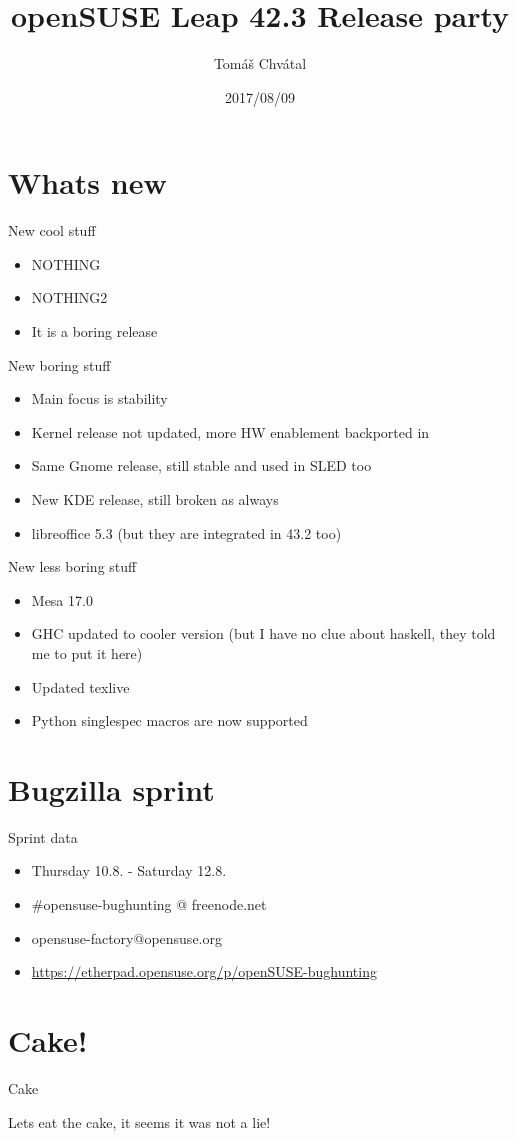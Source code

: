\documentclass{beamer}
\author{Tom\'{a}\v{s} Chv\'{a}tal\newline {\small tchvatal@suse.com}\newline {\small Packaging/L3 - Packaging}}
\title{openSUSE Leap 42.3 Release party}
\date{2017/08/09}
\begin{document}
\begin{frame}[t,plain]
\titlepage
\end{frame}

\section{Whats new}

\begin{frame}[t]{New cool stuff}
	\begin{itemize}
	\item NOTHING
	\item NOTHING2
	\item It is a boring release
	\end{itemize}
\end{frame}

\begin{frame}[t]{New boring stuff}
	\begin{itemize}
	\item Main focus is stability
	\item Kernel release not updated, more HW enablement backported in
	\item Same Gnome release, still stable and used in SLED too
	\item New KDE release, still broken as always
	\item libreoffice 5.3 (but they are integrated in 43.2 too)
	\end{itemize}
\end{frame}

\begin{frame}[t]{New less boring stuff}
	\begin{itemize}
	\item Mesa 17.0
	\item GHC updated to cooler version (but I have no clue about haskell, they told me to put it here)
	\item Updated texlive
	\item Python singlespec macros are now supported
	\end{itemize}
\end{frame}

\section{Bugzilla sprint}

\begin{frame}[t]{Sprint data}
	\begin{itemize}
	\item Thursday 10.8. - Saturday 12.8.
	\item \#opensuse-bughunting @ freenode.net
	\item opensuse-factory@opensuse.org
	\item \url{https://etherpad.opensuse.org/p/openSUSE-bughunting}
	\end{itemize}
\end{frame}

\section{Cake!}

\begin{frame}{Cake}
	\begin{center}
	Lets eat the cake, it seems it was not a lie!
	\end{center}
\end{frame}
\end{document}
